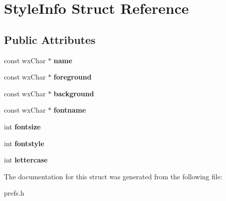 \hypertarget{struct_style_info}{\section{Style\+Info Struct Reference}
\label{struct_style_info}
}
\subsection*{Public Attributes}
\begin{DoxyCompactItemize}
\item 
\hypertarget{struct_style_info_a85cd3b65b5d8dda7c0ad9b0ab43c4850}{const wx\+Char $\ast$ {\bfseries name}}\label{struct_style_info_a85cd3b65b5d8dda7c0ad9b0ab43c4850}

\item 
\hypertarget{struct_style_info_ac012a82887301cbcbc08e2bdd660eb3c}{const wx\+Char $\ast$ {\bfseries foreground}}\label{struct_style_info_ac012a82887301cbcbc08e2bdd660eb3c}

\item 
\hypertarget{struct_style_info_aee79fdf6f6958597d36c453ab4bcddc8}{const wx\+Char $\ast$ {\bfseries background}}\label{struct_style_info_aee79fdf6f6958597d36c453ab4bcddc8}

\item 
\hypertarget{struct_style_info_af042851ce2370836f61abd1c3850b6f2}{const wx\+Char $\ast$ {\bfseries fontname}}\label{struct_style_info_af042851ce2370836f61abd1c3850b6f2}

\item 
\hypertarget{struct_style_info_a48d89f89cde92d8ffb7d5eb5021ee48c}{int {\bfseries fontsize}}\label{struct_style_info_a48d89f89cde92d8ffb7d5eb5021ee48c}

\item 
\hypertarget{struct_style_info_a3b8deeae812039660a177e98e749d735}{int {\bfseries fontstyle}}\label{struct_style_info_a3b8deeae812039660a177e98e749d735}

\item 
\hypertarget{struct_style_info_a50a9aa929cce38347977e33a5970b046}{int {\bfseries lettercase}}\label{struct_style_info_a50a9aa929cce38347977e33a5970b046}

\end{DoxyCompactItemize}


The documentation for this struct was generated from the following file\+:\begin{DoxyCompactItemize}
\item 
prefs.\+h\end{DoxyCompactItemize}
